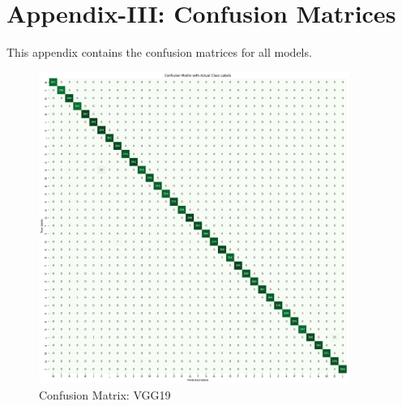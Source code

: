 \chapter*{Appendix-III: Confusion Matrices}

\noindent This appendix contains the confusion matrices for all models.

\setcounter{figure}{0} %
\renewcommand{\thefigure}{2.\arabic{figure}} %

\begin{figure}[h!]
    \centering
    \includegraphics[width=0.9\textwidth]{Assets/confusion_matrix/vgg19.png}
    \caption{Confusion Matrix: VGG19}
\end{figure}

\newpage

